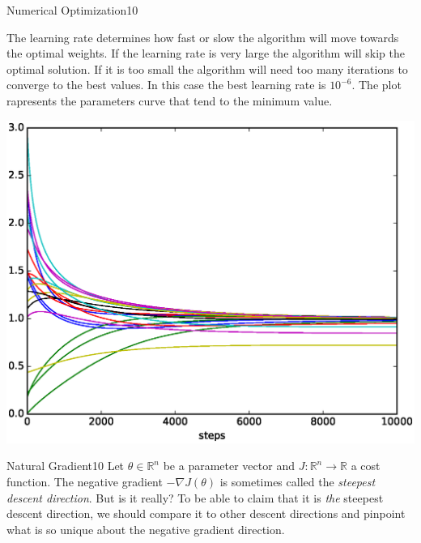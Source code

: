\begin{questions}
\begin{question}{Numerical Optimization}{10}
\begin{answer}

\medskip \medskip
The learning rate determines how fast or slow the algorithm will move towards the optimal weights. If the learning rate is very large the algorithm will skip the optimal solution. If it is too small the algorithm will need too many iterations to converge to the best values.
In this case the best learning rate is $ 10^{-6} $. The plot rapresents the parameters curve that tend to the minimum value. \\
\begin{center}
	\includegraphics [scale=0.75]{rosembrockPlot.eps}
\end{center}

\end{answer}

\end{question}


\begin{question}[bonus]{Natural Gradient}{10}
Let $\theta \in \mathbb{R}^n$ be a parameter vector
and $J \colon \mathbb{R}^n \to \mathbb{R}$ a cost function.
The negative gradient $-\nabla J(\theta)$ is sometimes called
the \emph{steepest descent direction}. But is it really?
To be able to claim that it is \emph{the} steepest descent direction,
we should compare it to other descent directions
and pinpoint what is so unique about the negative gradient direction.


\end{question}
\end{questions}
